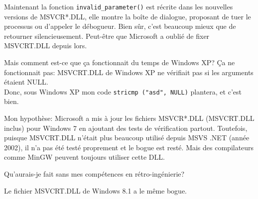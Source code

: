 Maintenant la fonction \verb|invalid_parameter()| est récrite dans les nouvelles
versions de MSVCR*.DLL, elle montre la boîte de dialogue, proposant de tuer le processus
ou d'appeler le débogueur.
Bien sûr, c'est beaucoup mieux que de retourner silencieusement.
Peut-être que Microsoft a oublié de fixer MSVCRT.DLL depuis lors.

Mais comment est-ce que ça fonctionnait du temps de Windows XP? Ça ne fonctionnait pas:
MSVCRT.DLL de Windows XP ne vérifiait pas si les arguments étaient NULL.\\
Donc, sous Windows XP mon code \verb|stricmp ("asd", NULL)| plantera, et c'est bien.

Mon hypothèse: Microsoft a mis à jour les fichiers MSVCR*.DLL (MSVCRT.DLL inclus)
pour Windows 7 en ajoutant des tests de vérification partout.
Toutefois, puisque MSVCRT.DLL n'était plus beaucoup utilisé depuis MSVS .NET
(année 2002), il n'a pas été testé proprement et le bogue est resté.
Mais des compilateurs comme MinGW peuvent toujours utiliser cette DLL.

Qu'aurais-je fait sans mes compétences en rétro-ingénierie?

Le fichier MSVCRT.DLL de Windows 8.1 a le même bogue.

